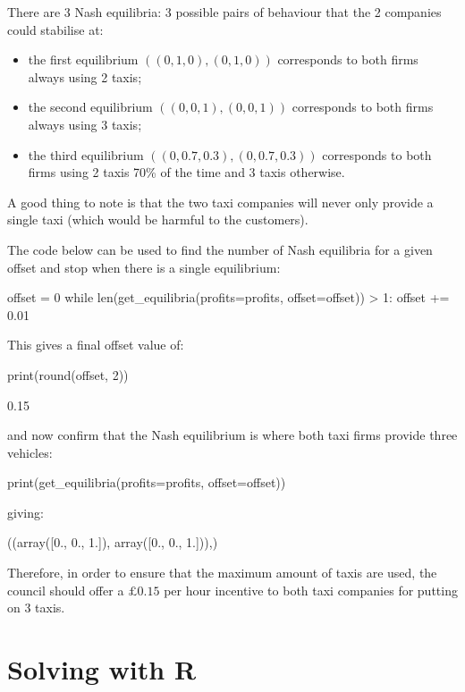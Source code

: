 There are 3 Nash equilibria: 3 possible pairs of behaviour that the 2
companies could stabilise at:

\begin{itemize}
    \item the first equilibrium \(((0, 1, 0), (0, 1, 0))\) corresponds to both
          firms always using 2 taxis;
    \item the second equilibrium \(((0, 0, 1), (0, 0, 1))\) corresponds to both
          firms always using 3 taxis;
    \item the third equilibrium \(((0, 0.7, 0.3), (0, 0.7, 0.3))\) corresponds to
          both firms using 2 taxis 70\% of the time and 3 taxis otherwise.
\end{itemize}

A good thing to note is that the two taxi companies will never only provide a
single taxi (which would be harmful to the customers).

The code below can be used to find the number of Nash equilibria for a given offset and
stop when there is a single equilibrium:

\begin{pyin}
offset = 0
while len(get_equilibria(profits=profits, offset=offset)) > 1:
    offset += 0.01
\end{pyin}

This gives a final offset value of:

\begin{pyin}
print(round(offset, 2))
\end{pyin}


\begin{pyout}
0.15
\end{pyout}

and now confirm that the Nash equilibrium is where both taxi firms provide
three vehicles:

\begin{pyin}
print(get_equilibria(profits=profits, offset=offset))
\end{pyin}

giving:

\begin{pyout}
((array([0., 0., 1.]), array([0., 0., 1.])),)
\end{pyout}

Therefore, in order to ensure that the maximum amount of taxis are used, the
council should offer a \(\pounds 0.15\) per hour incentive to both taxi
companies for putting on 3 taxis.

\section{Solving with R}\label{sec:game_theory_solving-with-R}

